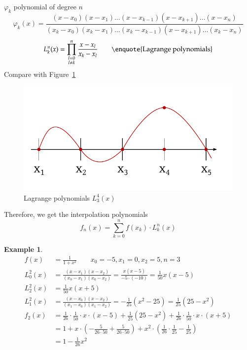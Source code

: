 \documentclass{article}
\newtheorem{example}{Example}
\begin{document}
$\varphi_k$ polynomial of degree $n$
\[
  \varphi_k(x) = \frac{(x - x_0) (x - x_1) \dots (x - x_{k-1}) (x - x_{k+1}) \dots (x - x_n)}{(x_k - x_0) (x_k - x_1) \dots (x_k - x_{k-1}) (x - x_{k+1}) \dots (x_k - x_n)}
\] \[
  L_k^n(x) = \prod_{\substack{l = 0 \\ l \neq k}}^n \frac{x - x_l}{x_k - x_l} \qquad \text{\enquote{Lagrange polynomials}}
\]
Compare with Figure~\ref{img:lagrange-poly}

\begin{figure}[t]
  \begin{center}
    \includegraphics{img/02_lagrange_polynomial.pdf}
    \caption{Lagrange polynomials $L_3^4(x)$}
    \label{img:lagrange-poly}
  \end{center}
\end{figure}

Therefore, we get the interpolation polynomials
\[ f_n(x) = \sum_{k=0}^n f(x_k) \cdot L_k^n(x) \]

\begin{example}
  \begin{align*}
    f(x) &= \frac{1}{1 + x^2} \qquad x_0 = -5, x_1 = 0, x_2 = 5, n = 3 \\
    L_0^2(x) &= \frac{(x - x_1) (x - x_2)}{(x_0 - x_1) (x_0 - x_2)} = \frac{x (x - 5)}{-5 \cdot (-10)} = \frac{1}{50} x ( x - 5) \\
    L_2^2(x) &= \frac1{50} x (x + 5) \\
    L_1^2(x) &= \frac{(x - x_0) (x - x_2)}{(x_1 - x_0) (x_1 - x_2)} = -\frac1{25} (x^2 - 25) = \frac{1}{25} (25 - x^2) \\
    f_2(x) &= \frac1{26} \cdot \frac1{50} \cdot x \cdot (x - 5) + \frac1{25} (25 - x^2) + \frac1{26} \cdot \frac1{50} \cdot x \cdot (x + 5) \\
    &= 1 + x \cdot \left(-\frac{5}{26 \cdot 50} + \frac{5}{26 \cdot 50}\right) + x^2 \cdot \left(\frac{1}{26} \cdot \frac{1}{25} - \frac{1}{25}\right) \\
    &= 1 - \frac{1}{26} x^2
  \end{align*}
\end{example}
\end{document}
